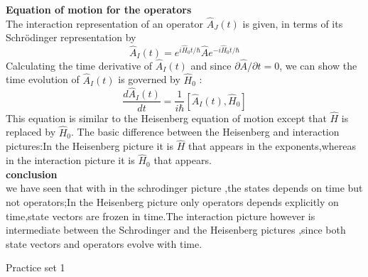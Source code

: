 \textbf{Equation of motion for the operators}\\
The interaction representation of an operator $\hat{A}_{J}(t)$ is given, in terms of its Schrödinger representation by
$$
\hat{A}_{I}(t)=e^{i \hat{H}_{0} t / \hbar} \hat{A} e^{-i \hat{H}_{0} t / \hbar}
$$
Calculating the time derivative of $\hat{A}_{I}(t)$ and since $\partial \hat{A} / \partial t=0$, we can show the time evolution of $\hat{A}_{I}(t)$ is governed by $\hat{H}_{0}$ :
$$
\frac{d \hat{A}_{I}(t)}{d t}=\frac{1}{i \hbar}\left[\hat{A}_{I}(t), \hat{H}_{0}\right]
$$
This equation is similar to the Heisenberg equation of motion except that $\hat{H}$ is replaced by $\hat{H}_{0}$. The basic difference between the Heisenberg and interaction pictures:In the Heisenberg picture it is $\hat{H}$ that appears in the exponents,whereas in the interaction picture it is $\hat{H}_0$ that appears.\\
\textbf{conclusion}\\
 we have seen that with in the schrodinger picture ,the states depends on time but not operators;In the Heisenberg picture only operators depends explicitly on time,state vectors are frozen in time.The interaction picture however is intermediate between the Schrodinger and the Heisenberg pictures ,since both state vectors and operators evolve with time.\\
 \newpage
 \begin{abox}
 	Practice set 1
 	\end{abox}
